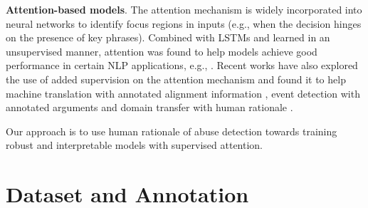\documentclass[letterpaper]{article} %
\begin{document}

\noindent\textbf{Attention-based models}.
The attention mechanism is widely incorporated into neural networks to identify focus regions in inputs (e.g., when the decision hinges on the presence of key phrases). Combined with LSTMs and learned in an unsupervised manner,  attention was  found to help models achieve good performance in certain NLP applications, e.g., \cite{luong2015effective}. Recent works have also explored the use of added supervision on the attention mechanism and found it  to help machine translation with annotated alignment information  \cite{liu2016neural}, event detection with annotated arguments  \cite{liu2017exploiting} and domain transfer with human rationale \cite{bao2018deriving}.

Our approach is to use  human rationale of abuse detection towards training robust and interpretable models with supervised attention.


\section{Dataset and Annotation}
\label{sec:dataset}
\end{document}
